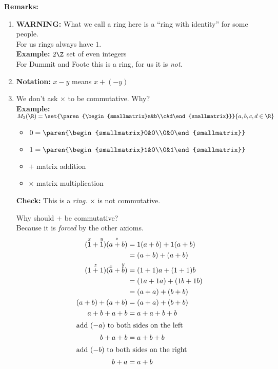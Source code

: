 \textbf{Remarks:}
\begin{enumerate}
\item \textbf{WARNING:} What we call a ring here is a ``ring with identity'' for some people. \\
For us rings always have $1$. \\
\textbf{Example:} $2\Z$ set of even integers \\
For Dummit and Foote this is a ring, for us it is \emph{not}.
\item \textbf{Notation:} $x-y$ means $x+(-y)$
\item We don't ask $\times$ to be commutative.  Why? \\
\textbf{Example:} $M_2(\R)=\set{\paren{\begin{smallmatrix}a&b\\c&d\end{smallmatrix}}}{a,b,c,d\in\R}$
\begin{itemize}
\item $0=\paren{\begin{smallmatrix}0&0\\0&0\end{smallmatrix}}$
\item $1=\paren{\begin{smallmatrix}1&0\\0&1\end{smallmatrix}}$
\item $+$ matrix addition
\item $\times$ matrix multiplication
\end{itemize}
\textbf{Check:} This is a \emph{ring}.  $\times$ is not commutative.

Why should $+$ be commutative? \\
Because it is \emph{forced} by the other axioms.
\begin{align*}
(\overset{x}{1}+\overset{y}{1})(\overset{z}{a+b}) &= 1(a+b) + 1(a+b) \\
&= (a+b) + (a+b) \\
(\overset{z}{1+1})(\overset{x}{a}+\overset{y}{b}) &= (1+1)a + (1+1)b \\
&= (1a+1a) + (1b+1b) \\
&= (a+a) + (b+b) \\
(a+b) + (a+b) &= (a+a) + (b+b) \\
a+b+a+b &= a+a+b+b \\
\intertext{add $(-a)$ to both sides on the left}
b+a+b &= a+b+b \\
\intertext{add $(-b)$ to both sides on the right}
b+a &= a+b %
\end{align*}
\end{enumerate}